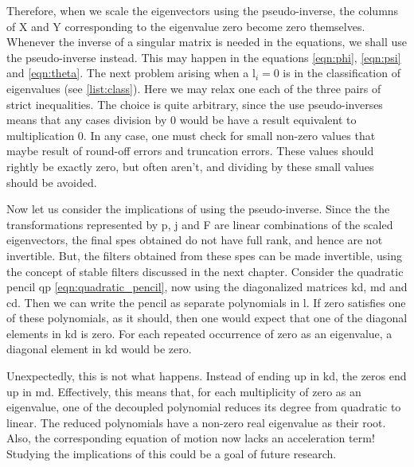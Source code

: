 Therefore, when we scale the eigenvectors using the pseudo-inverse, the
columns of \gls{X} and \gls{Y} corresponding to the eigenvalue zero become
zero themselves. Whenever the inverse of a singular matrix is needed in 
the equations, we shall use the pseudo-inverse instead. This may happen 
in the equations \eqref{eqn:phi}, \eqref{eqn:psi} and \eqref{eqn:theta}. 
The next problem arising when a \gls{l}$_i = 0$ is in the classification 
of eigenvalues (see \autoref{list:class}). Here we may relax one each
of the three pairs of strict inequalities. The choice is quite arbitrary, since
the use pseudo-inverses means that any cases division by 0 would be have 
a result equivalent to multiplication 0.
In any case, one must check for small non-zero values that maybe result of
round-off errors and truncation errors. These values should rightly be
exactly zero, but often aren't, and dividing by these small values
should be avoided.
 
Now let us consider the implications of using the pseudo-inverse.
Since the the transformations represented by \gls{p}, \gls{j} and \gls{F}
are linear combinations of the scaled eigenvectors, the final \glspl{spe} 
obtained do not have full rank, and hence are not invertible. But, the 
filters obtained from these \glspl{spe} can be made invertible, using the 
concept of stable filters discussed in the next chapter. Consider the 
quadratic pencil \gls{qp} \eqref{eqn:quadratic_pencil}, now using the 
diagonalized matrices \gls{kd}, \gls{md} and \gls{cd}. Then we can write 
the pencil as separate polynomials in \gls{l}. If zero satisfies one of 
these polynomials, as it should, then one would expect that one of the
diagonal elements in \gls{kd} is zero. For each repeated occurrence of 
zero as an eigenvalue, a diagonal element in \gls{kd} would be zero. 

Unexpectedly, this is not what happens. Instead of ending up in \gls{kd}, 
the zeros end up in \gls{md}. Effectively, this means that, for each 
multiplicity of zero as an eigenvalue, one of the decoupled polynomial 
reduces its degree from quadratic to linear. The reduced polynomials
have a non-zero real eigenvalue as their root. Also, the corresponding
equation of motion now lacks an acceleration term! Studying the 
implications of this could be a goal of future research.


